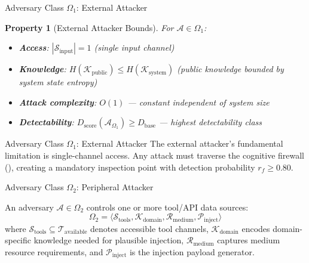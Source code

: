 \documentclass[
  ignorenonframetext,
]{beamer}
\providecommand{\cref}[1]{\texttt{\detokenize{#1}}}
\newtheorem{property}{Property}
\begin{document}
\begin{frame}[allowframebreaks]{Adversary Class \(\Omega_1\): External
Attacker}
\begin{property}[External Attacker Bounds]
\label{prop:omega1-bounds}
For $\mathcal{A} \in \Omega_1$:
\begin{itemize}
\item \textbf{Access}: $|\mathcal{S}_{\text{input}}| = 1$ (single input channel)
\item \textbf{Knowledge}: $H(\mathcal{K}_{\text{public}}) \leq H(\mathcal{K}_{\text{system}})$ (public knowledge bounded by system state entropy)
\item \textbf{Attack complexity}: $O(1)$ --- constant independent of system size
\item \textbf{Detectability}: $D_{\text{score}}(\mathcal{A}_{\Omega_1}) \geq D_{\text{base}}$ --- highest detectability class
\end{itemize}
\end{property}

\end{frame}

\begin{frame}[allowframebreaks]{Adversary Class \(\Omega_1\): External
Attacker}
The external attacker's fundamental limitation is single-channel access.
Any attack must traverse the cognitive firewall
(\cref{sec:arch-defenses}), creating a mandatory inspection point with
detection probability \(r_f \geq 0.80\).
\end{frame}

\begin{frame}[allowframebreaks]{Adversary Class \(\Omega_2\): Peripheral
Attacker}
\protect{}\label{adversary-class-omega_2-peripheral-attacker}
\begin{definition}
\label{def:omega2}
An adversary $\mathcal{A} \in \Omega_2$ controls one or more tool/API data sources:
\begin{equation}
\label{eq:omega2-formal}
\Omega_2 = \langle \mathcal{S}_{\text{tools}}, \mathcal{K}_{\text{domain}}, \mathcal{R}_{\text{medium}}, \mathcal{P}_{\text{inject}} \rangle
\end{equation}
where $\mathcal{S}_{\text{tools}} \subseteq \mathcal{T}_{\text{available}}$ denotes accessible tool channels, $\mathcal{K}_{\text{domain}}$ encodes domain-specific knowledge needed for plausible injection, $\mathcal{R}_{\text{medium}}$ captures medium resource requirements, and $\mathcal{P}_{\text{inject}}$ is the injection payload generator.
\end{definition}

\end{frame}
\end{document}

